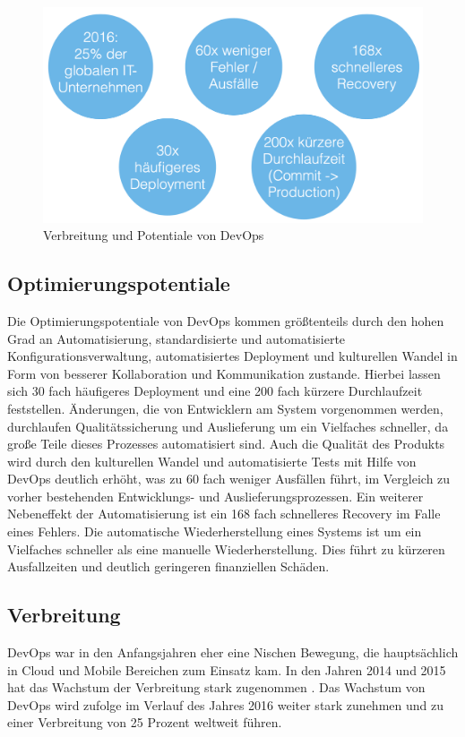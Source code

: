 \begin{figure}[ht]
  \centering
  \includegraphics[width=\textwidth]{img/devops_zahlen.png}
  \caption{Verbreitung und Potentiale von DevOps}
  \label{fig:devops_numbers}
\end{figure}

\subsection{Optimierungspotentiale}
Die Optimierungspotentiale von DevOps kommen größtenteils durch den hohen Grad an Automatisierung, standardisierte und automatisierte Konfigurationsverwaltung, automatisiertes Deployment und kulturellen Wandel in Form von besserer Kollaboration und Kommunikation zustande. 
Hierbei lassen sich 30 fach häufigeres Deployment und eine 200 fach kürzere Durchlaufzeit feststellen. 
Änderungen, die von Entwicklern am System vorgenommen werden, durchlaufen Qualitätssicherung und Auslieferung um ein Vielfaches schneller, da große Teile dieses Prozesses automatisiert sind. 
Auch die Qualität des Produkts wird durch den kulturellen Wandel und automatisierte Tests mit Hilfe von DevOps deutlich erhöht, was zu 60 fach weniger Ausfällen führt, im Vergleich zu vorher bestehenden Entwicklungs- und Auslieferungsprozessen. 
Ein weiterer Nebeneffekt der Automatisierung ist ein 168 fach schnelleres Recovery im Falle eines Fehlers. 
Die automatische Wiederherstellung eines Systems ist um ein Vielfaches schneller als eine manuelle Wiederherstellung. 
Dies führt zu kürzeren Ausfallzeiten und deutlich geringeren finanziellen Schäden. 
\parencite[Vgl.][S. 10]{DevOpsSODR:2015}

\subsection{Verbreitung}
DevOps war in den Anfangsjahren eher eine Nischen Bewegung, die hauptsächlich in Cloud und Mobile Bereichen zum Einsatz kam. 
In den Jahren 2014 und 2015 hat das Wachstum der Verbreitung stark zugenommen \parencite[vgl.][S. 7]{DevOpsSODR:2014, DevOpsSODR:2015}. 
Das Wachstum von DevOps wird \parencite[][]{Gartner:2015} zufolge im Verlauf des Jahres 2016 weiter stark zunehmen und zu einer Verbreitung von 25 Prozent weltweit führen.

